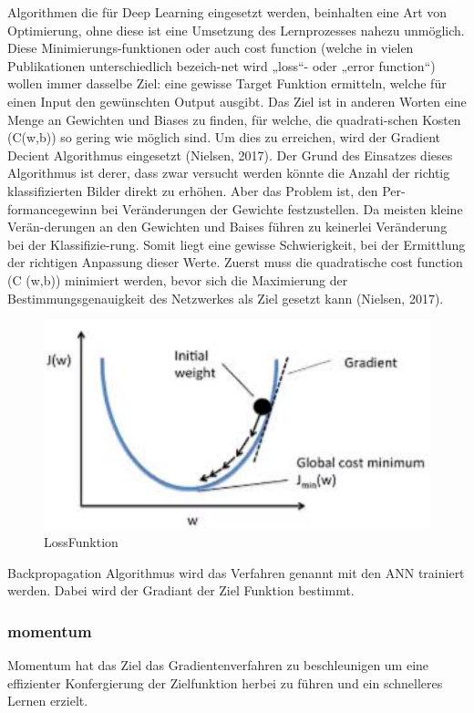 \documentclass{llncs}
\begin{document}
Algorithmen die für Deep Learning eingesetzt werden, beinhalten eine Art von Optimierung, ohne diese ist eine Umsetzung des Lernprozesses nahezu unmöglich. Diese Minimierungs-funktionen oder auch cost function (welche in vielen Publikationen unterschiedlich bezeich-net wird „loss“- oder „error function“) wollen immer dasselbe Ziel: eine gewisse Target Funktion ermitteln, welche für einen Input den gewünschten Output ausgibt. Das Ziel ist in anderen Worten eine Menge an Gewichten und Biases zu finden, für welche, die quadrati-schen Kosten (C(w,b)) so gering wie möglich sind. Um dies zu erreichen, wird der Gradient Decient Algorithmus eingesetzt (Nielsen, 2017).
Der Grund des Einsatzes dieses Algorithmus ist derer, dass zwar versucht werden könnte die Anzahl der richtig klassifizierten Bilder direkt zu erhöhen. Aber das Problem ist, den Per-formancegewinn bei Veränderungen der Gewichte festzustellen. Da meisten kleine Verän-derungen an den Gewichten und Baises führen zu keinerlei Veränderung bei der Klassifizie-rung. Somit liegt eine gewisse Schwierigkeit, bei der Ermittlung der richtigen Anpassung dieser Werte. Zuerst muss die quadratische cost function (C (w,b)) minimiert werden, bevor sich die Maximierung der Bestimmungsgenauigkeit des Netzwerkes als Ziel gesetzt kann (Nielsen, 2017).
\begin{figure}[htbp] 
	\centering
	\includegraphics[width=1.0\textwidth]{gradient.png}
	\caption{LossFunktion}
	\label{fig:Bild1}
\end{figure}

Backpropagation Algorithmus wird das Verfahren genannt mit den ANN trainiert werden. Dabei wird der Gradiant der Ziel Funktion bestimmt.

\subsubsection{momentum}
Momentum hat das Ziel das Gradientenverfahren zu beschleunigen  um eine effizienter Konfergierung der Zielfunktion herbei zu führen und ein schnelleres Lernen erzielt. 
\end{document}
